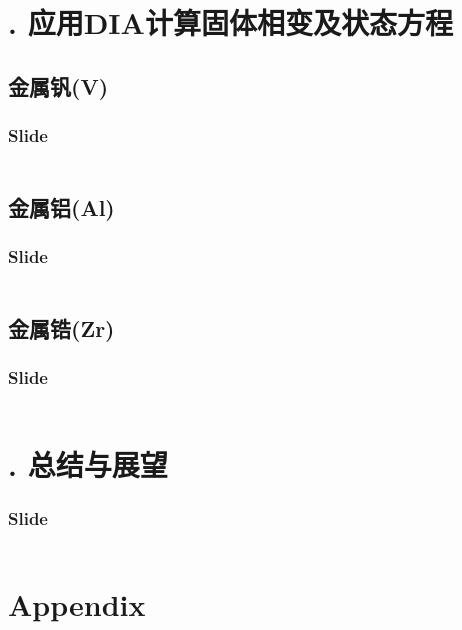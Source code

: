 \documentclass[9pt,aspectratio=169]{beamer}
\begin{document}
\section{\uppercase\expandafter{}. 应用DIA计算固体相变及状态方程}
\subsection{金属钒(V)}
\begin{frame}
  \frametitle[t]{Slide}
  \begin{columns}
  \end{columns}
\end{frame}
\subsection{金属铝(Al)}
\begin{frame}
  \frametitle[t]{Slide}
  \begin{columns}
  \end{columns}
\end{frame}
\subsection{金属锆(Zr)}
\begin{frame}
  \frametitle[t]{Slide}
  \begin{columns}
  \end{columns}
\end{frame}
\section{\uppercase\expandafter{}. 总结与展望}
\begin{frame}
  \frametitle[t]{Slide}
  \begin{columns}
  \end{columns}
\end{frame}
\section{Appendix}
\end{document}
